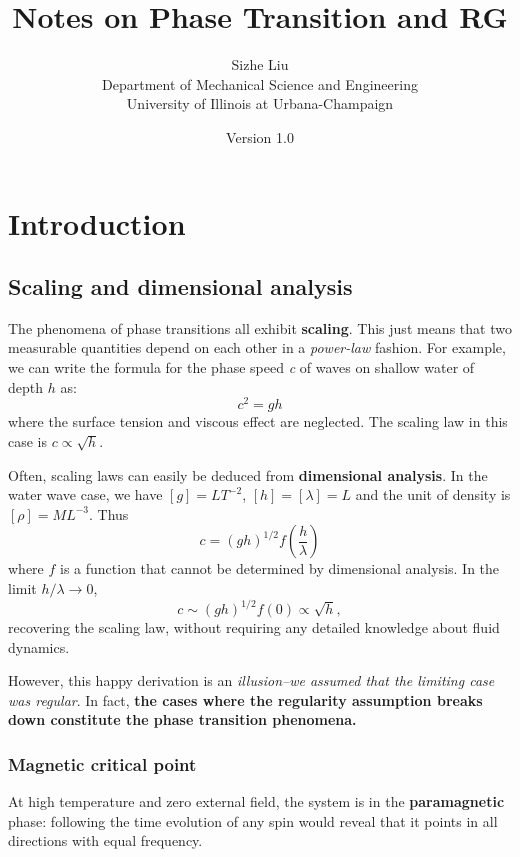 \documentclass[12pt,titlepage]{article}
\title{Notes on Phase Transition and RG}
\author{Sizhe Liu\\Department of Mechanical Science and Engineering
\\University of Illinois at Urbana-Champaign}
\date{Version 1.0}
\numberwithin{equation}{section}
\begin{document}
\maketitle

\section{Introduction}
\subsection{Scaling and dimensional analysis}
The phenomena of phase transitions all exhibit \textbf{scaling}. This just means that two measurable quantities depend on each other in a \emph{power-law} fashion. For example, we can write the formula for the phase speed \textit{c} of waves on shallow water of depth $h$ as:
\begin{equation}
    c^2=gh
\end{equation}
where the surface tension and viscous effect are neglected. The scaling law in this case is $c\propto\sqrt{h}$.

Often, scaling laws can easily be deduced from \textbf{dimensional analysis}. In the water wave case, we have $[g]=LT^{-2}$, $[h]=[\lambda]=L$ and the unit of density is $[\rho]=ML^{-3}$. Thus
\begin{equation}
    c=(gh)^{1/2}f(\frac{h}{\lambda})
\end{equation}
where $f$ is a function that cannot be determined by dimensional analysis. In the limit $h/\lambda\rightarrow 0$,
\begin{equation}
    c \sim (gh)^{1/2}f(0)\propto\sqrt{h},
\end{equation}
recovering the scaling law, without requiring any detailed knowledge about fluid dynamics.

However, this happy derivation is an \emph{illusion--we assumed that the limiting case was regular}. In fact, \textbf{the cases where the regularity assumption breaks down constitute the phase transition phenomena.}

\subsubsection{Magnetic critical point}
At high temperature and zero external field, the system is in the \textbf{paramagnetic }phase: following the time evolution of any spin would reveal that it points in all directions with equal frequency.
\end{document}
